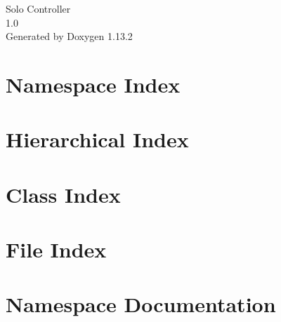 \documentclass[twoside]{book}
\newcommand{\+}{\discretionary{\mbox{\scriptsize$\hookleftarrow$}}{}{}}
\newcommand{\clearemptydoublepage}{%
    \newpage{\pagestyle{empty}\cleardoublepage}%
  }
\begin{document}
  \raggedbottom
    \hypersetup{pageanchor=false,
                bookmarksnumbered=true,
                pdfencoding=unicode
               }
  \begin{titlepage}
  \vspace*{7cm}
  \begin{center}%
  {\Large Solo Controller}\\
  [1ex]\large 1.\+0 \\
  \vspace*{1cm}
  {\large Generated by Doxygen 1.13.2}\\
  \end{center}
  \end{titlepage}
  \clearemptydoublepage
  \tableofcontents
  \clearemptydoublepage
  \hypersetup{pageanchor=true}




\chapter{Namespace Index}

\chapter{Hierarchical Index}

\chapter{Class Index}

\chapter{File Index}

\chapter{Namespace Documentation}



















\end{document}
